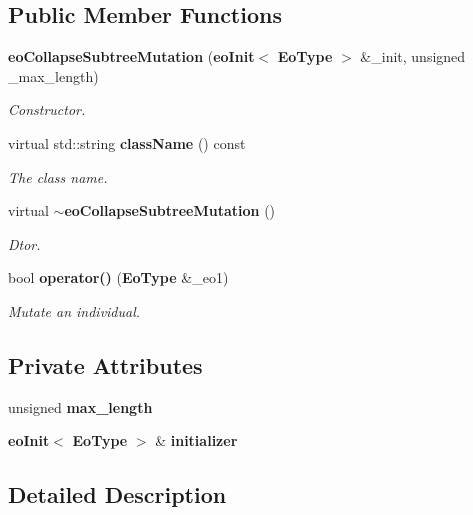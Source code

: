\subsection*{Public Member Functions}
\begin{CompactItemize}
\item 
{\bf eo\-Collapse\-Subtree\-Mutation} ({\bf eo\-Init}$<$ {\bf Eo\-Type} $>$ \&\_\-init, unsigned \_\-max\_\-length)
\begin{CompactList}\small\item\em Constructor. \item\end{CompactList}\item 
virtual std::string {\bf class\-Name} () const \label{classeo_collapse_subtree_mutation_a1}

\begin{CompactList}\small\item\em The class name. \item\end{CompactList}\item 
virtual {\bf $\sim$eo\-Collapse\-Subtree\-Mutation} ()\label{classeo_collapse_subtree_mutation_a2}

\begin{CompactList}\small\item\em Dtor. \item\end{CompactList}\item 
bool {\bf operator()} ({\bf Eo\-Type} \&\_\-eo1)
\begin{CompactList}\small\item\em Mutate an individual. \item\end{CompactList}\end{CompactItemize}
\subsection*{Private Attributes}
\begin{CompactItemize}
\item 
unsigned {\bf max\_\-length}\label{classeo_collapse_subtree_mutation_r0}

\item 
{\bf eo\-Init}$<$ {\bf Eo\-Type} $>$ \& {\bf initializer}\label{classeo_collapse_subtree_mutation_r1}

\end{CompactItemize}


\subsection{Detailed Description}
